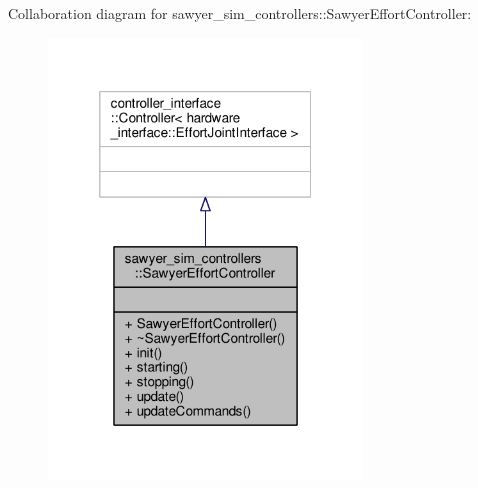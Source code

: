 Collaboration diagram for sawyer\-\_\-sim\-\_\-controllers\-:\-:Sawyer\-Effort\-Controller\-:\nopagebreak
\begin{figure}[H]
\begin{center}
\leavevmode
\includegraphics[width=236pt]{classsawyer__sim__controllers_1_1_sawyer_effort_controller__coll__graph}
\end{center}
\end{figure}
